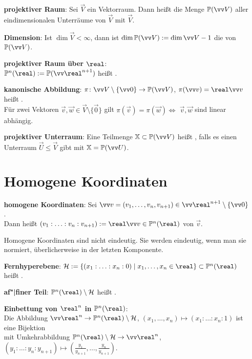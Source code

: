 \textbf{projektiver Raum}:
Sei $\vec{V}$ ein Vektorraum.
Dann heißt die Menge $\PP(\vec{V})$ aller eindimensionalen Unterräume von $\vec{V}$
 mit  $\vec{V}$.

\textbf{Dimension}:
Ist $\dim \vec{V} < \infty$, dann ist $\dim \PP(\vec{V}) := \dim \vec{V} - 1$ die
 von $\PP(\vec{V})$.

\textbf{projektiver Raum über $\real$}:\\
$\PP^n(\real) := \PP(\vec{\real}^{n+1})$ heißt
.

\textbf{kanonische Abbildung}:
$\pi\colon \vec{V} \setminus \{\vec{0}\} \to \PP(\vec{V})$, $\pi(\vec{v}) = \real\vec{v}$
heißt .\\
Für zwei Vektoren $\vec{v}, \vec{w} \in \vec{V} \setminus \{\vec{0}\}$ gilt
$\pi(\vec{v}) = \pi(\vec{w}) \iff$ $\vec{v}, \vec{w}$ sind linear abhängig.

\textbf{projektiver Unterraum}:
Eine Teilmenge $\XX \subset \PP(\vec{V})$ heißt ,
falls es einen Unterraum $\vec{U} \le \vec{V}$ gibt mit $\XX = \PP(\vec{U})$.

\section{%
    Homogene Koordinaten%
}

\textbf{homogene Koordinaten}:
Sei $\vec{v} = (v_1, \dotsc, v_n, v_{n+1}) \in \vec{\real}^{n+1} \setminus \{\vec{0}\}$.\\
Dann heißt $(v_1 : \dotsc : v_n : v_{n+1}) := \real\vec{v} \in \PP^n(\real)$
 von $\vec{v}$.

Homogene Koordinaten sind nicht eindeutig.
Sie werden eindeutig, wenn man sie normiert,
überlicherweise in der letzten Komponente.

\textbf{Fernhyperebene}:
$\H := \{(x_1 : \dotsc : x_n : 0) \;|\; x_1, \dotsc, x_n \in \real\} \subset \PP^n(\real)$
heißt .

\textbf{af"|finer Teil}:
$\PP^n(\real) \setminus \H$ heißt .

\textbf{Einbettung von $\real^n$ in $\PP^n(\real)$}:\\
Die Abbildung
$\vec{\real}^n \to \PP^n(\real) \setminus \H$,
$(x_1, \dotsc, x_n) \mapsto (x_1 : \dotsc : x_n : 1)$
ist eine Bijektion\\
mit Umkehrabbildung
$\PP^n(\real) \setminus \H \to \vec{\real}^n$,
$(y_1 : \dotsc : y_n : y_{n+1}) \mapsto (\frac{y_1}{y_{n+1}}, \dotsc, \frac{y_n}{y_{n+1}})$.

